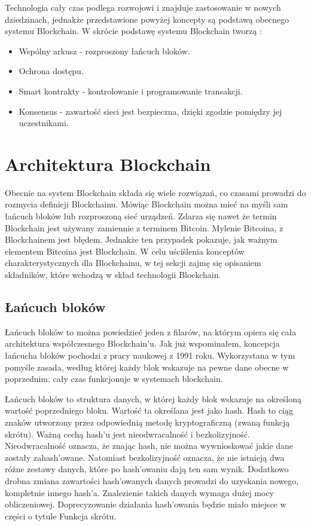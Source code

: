 \documentclass[a4paper,12pt]{book}
\begin{document}
Technologia cały czas podlega rozwojowi i znajduje zastosowanie w nowych dziedzinach, jednakże przedstawione powyżej koncepty są podstawą obecnego systemu Blockchain. W skrócie podstawę systemu Blockchain tworzą \cite{4-concepts}:
\begin{itemize}
	\item Wspólny arkusz - rozproszony łańcuch bloków.
	\item Ochrona dostępu.
	\item Smart kontrakty - kontrolowanie i programowanie transakcji.
	\item Konsensus - zawartość sieci jest bezpieczna, dzięki zgodzie pomiędzy jej uczestnikami.
\end{itemize}

\section{Architektura Blockchain}

Obecnie na system Blockchain składa się wiele rozwiązań, co czasami prowadzi do rozmycia definicji Blockchainu. Mówiąc Blockchain można mieć na myśli sam łańcuch bloków lub rozproszoną sieć urządzeń. Zdarza się nawet że termin Blockchain jest używany zamiennie z terminem Bitcoin\cite{bitcoin-vs-blockchain}. Mylenie Bitcoina, z Blockchainem jest błędem. Jednakże ten przypadek pokazuje, jak ważnym elementem Bitcoina jest Blockchain. W celu uściślenia konceptów charakterystycznych dla Blockchainu, w tej sekcji zajmę się opisaniem składników, które wchodzą w skład technologii Blockchain.

\subsection{Łańcuch bloków}

Łańcuch bloków to można powiedzieć jeden z filarów, na którym opiera się cała architektura współczesnego Blockchain'u. Jak już wspominałem, koncepcja łańcucha bloków pochodzi z pracy naukowej z 1991 roku. Wykorzystana w tym pomyśle zasada, według której każdy blok wskazuje na pewne dane obecne w poprzednim, cały czas funkcjonuje w systemach blockchain.

Łańcuch bloków to struktura danych, w której każdy blok wskazuje na określoną wartość poprzedniego bloku. Wartość ta określana jest jako hash. Hash to ciąg znaków utworzony przez odpowiednią metodę kryptograficzną (zwaną funkcją skrótu). Ważną cechą hash'u jest nieodwracalność i bezkolizyjność. Nieodwracalność oznacza, że znając hash, nie można wywnioskować jakie dane zostały zahash'owane. Natomiast bezkolizyjność oznacza, że nie istnieją dwa różne zestawy danych, które po hash'owaniu dają ten sam wynik. Dodatkowo drobna zmiana zawartości hash'owanych danych prowadzi do uzyskania nowego, kompletnie innego hash'a. Znalezienie takich danych wymaga dużej mocy obliczeniowej\cite{hash}. Doprecyzowanie działania hash'owania będzie miało miejsce w części o tytule Funkcja skrótu.
\end{document}
